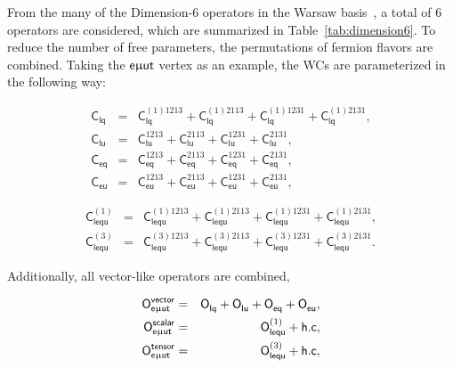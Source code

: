 From the many of the Dimension-6 operators in the Warsaw basis~\cite{Grzadkowski:2010es,Aguilar-Saavedra:2018ksv}, a total of 6 operators are considered, which are summarized in Table~\ref{tab:dimension6}. To reduce the number of free parameters, the permutations of fermion flavors are combined. Taking the $\textsf{e}\upmu\textsf{{u}t}$ vertex as an example, the \acp{WC} are parameterized in the following way:

\begin{eqnarray}
\label{eq:1:0}
 \textsf{C}_{\textsf{lq}}
 &=& \textsf{C}_{\textsf{lq}}^{(1)1213}
 + \textsf{C}_{\textsf{lq}}^{(1)2113}
 + \textsf{C}_{\textsf{lq}}^{(1)1231}
 + \textsf{C}_{\textsf{lq}}^{(1)2131}
 ,\\
\label{eq1:1}
 \textsf{C}_{\textsf{lu}}  
 &=& \textsf{C}_{\textsf{lu}}^{1213}
 + \textsf{C}_{\textsf{lu}}^{2113}
 + \textsf{C}_{\textsf{lu}}^{1231}
 + \textsf{C}_{\textsf{lu}}^{2131}
 ,\\
 \label{eq:1:2}
 \textsf{C}_{\textsf{eq}}
 &=& \textsf{C}_{\textsf{eq}}^{1213}
 + \textsf{C}_{\textsf{eq}}^{2113}
 + \textsf{C}_{\textsf{eq}}^{1231}
 + \textsf{C}_{\textsf{eq}}^{2131}
 ,\\
 \label{eq:1:3}
 \textsf{C}_{\textsf{eu}}  
 &=& \textsf{C}_{\textsf{eu}}^{1213}
 + \textsf{C}_{\textsf{eu}}^{2113}
 + \textsf{C}_{\textsf{eu}}^{1231}
 + \textsf{C}_{\textsf{eu}}^{2131},
\end{eqnarray}

\begin{eqnarray}
\label{eq:1:4}
 \textsf{C}_{\textsf{lequ}}^{(1)}  
 &=& \textsf{C}_{\textsf{lequ}}^{(1)1213}
 + \textsf{C}_{\textsf{lequ}}^{(1)2113}
 + \textsf{C}_{\textsf{lequ}}^{(1)1231}
 + \textsf{C}_{\textsf{lequ}}^{(1)2131}
 ,\\
\label{eq:1:5}
 \textsf{C}_{\textsf{lequ}}^{(3)}
 &=& \textsf{C}_{\textsf{lequ}}^{(3)1213}
 + \textsf{C}_{\textsf{lequ}}^{(3)2113}
 + \textsf{C}_{\textsf{lequ}}^{(3)1231}
 + \textsf{C}_{\textsf{lequ}}^{(3)2131}. 
\end{eqnarray}

Additionally, all vector-like operators are combined,

\begin{eqnarray}
\label{eq:1:6}
 \textsf{O}^{\textsf{vector}}_{\textsf{e}\upmu\textsf{{u}t}}&=&\textsf{O}^{}_{\textsf{lq}}+\textsf{O}^{}_{\textsf{lu}}+\textsf{O}^{}_{\textsf{eq}}+\textsf{O}^{}_{\textsf{eu}},\\
\label{eq:1:7}
 \textsf{O}^{\textsf{scalar}}_{\textsf{e}\upmu\textsf{{u}t}}&=&\textsf{O}^{(1)}_{\textsf{lequ}}+\textsf{h.c},\\
\label{eq:1:8}
 \textsf{O}^{\textsf{tensor}}_{\textsf{e}\upmu\textsf{{u}t}}&=&\textsf{O}^{(3)}_{\textsf{lequ}}+\textsf{h.c},
\end{eqnarray}

